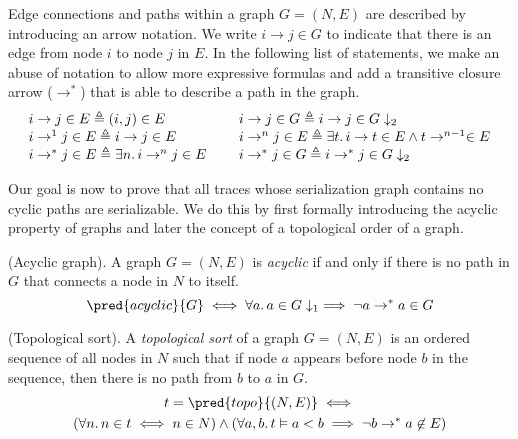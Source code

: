 Edge connections and paths within a graph $G = (N, E)$ are described by introducing an arrow notation. We write $i \rightarrow j \in G$ to indicate that there is an edge from node $i$ to node $j$ in $E$. In the following list of statements, we make an abuse of notation to allow more expressive formulas and add a transitive closure arrow ($\rightarrow^*$) that is able to describe a path in the graph.
\[
	\begin{array}{l l}
		i \rightarrow j \in E \triangleq (i, j) \in E
			&
		i \rightarrow j \in G \triangleq i \rightarrow j \in G \downarrow_2
			\\
		i \rightarrow^1 j \in E \triangleq i \rightarrow j \in E
			&
		i \rightarrow^n j \in E \triangleq \exists t \ldotp i \rightarrow t \in E \land t \rightarrow^{n-1} \in E
			\\
		i \rightarrow^* j \in E \triangleq \exists n \ldotp i \rightarrow^n j \in E
			\ \ \ \ &
		i \rightarrow^* j \in G \triangleq i \rightarrow^* j \in G \downarrow_2
	\end{array}		
\]

Our goal is now to prove that all traces whose serialization graph contains no cyclic paths are serializable. We do this by first formally introducing the acyclic property of graphs and later the concept of a topological order of a graph.

\begin{defn}
	(Acyclic graph).
	A graph $G = (N, E)$ is \emph{acyclic} if and only if there is no path in $G$ that connects a node in $N$ to itself.
	\[
		\pred{acyclic}{G} \iff \forall a \ldotp a \in G \downarrow_1 \implies \lnot a \rightarrow^* a \in G
	\]
\end{defn}

\begin{defn}
	(Topological sort).
	A \emph{topological sort} of a graph $G = (N, E)$ is an ordered sequence of all nodes in $N$ such that if node $a$ appears before node $b$ in the sequence, then there is no path from $b$ to $a$ in $G$.
	\begin{gather*}
		t = \pred{topo}{(N, E)} \iff \\
		(\forall n \ldotp n \in t \iff n \in N) \land (\forall a, b \ldotp t \vDash a < b \implies \lnot b \rightarrow^* a \not\in E)
	\end{gather*}
\end{defn}

